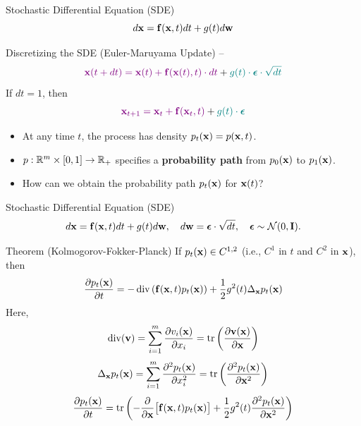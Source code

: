 \documentclass{beamer}
\begin{document}
\begin{frame}{Stochastic Differential Equation (SDE)}
	\[
		d\mathbf{x} = \mathbf{f}(\mathbf{x}, t) dt + g(t) d \mathbf{w}
	\]
	\vspace{-0.3cm}
	\begin{block}{Discretizing the SDE (Euler-Maruyama Update) – \SDESolve}
		\vspace{-0.3cm}
		\[
			{\color{violet}\mathbf{x}(t + dt) = \mathbf{x}(t) + \mathbf{f}(\mathbf{x}(t), t) \cdot dt} + {\color{teal}g(t) \cdot \boldsymbol{\epsilon} \cdot \sqrt{dt}}
		\]
		\eqpause
		If $dt=1$, then
		\vspace{-0.3cm}
		\[
			{\color{violet}\mathbf{x}_{t + 1} = \mathbf{x}_t + \mathbf{f}(\mathbf{x}_t, t)} + {\color{teal}g(t) \cdot \boldsymbol{\epsilon}}
		\]
		\vspace{-0.7cm}
	\end{block}
	\eqpause
	\begin{itemize}
		\item At any time $t$, the process has density $p_t(\mathbf{x}) = p(\mathbf{x}, t)$.
		\item $p: \mathbb{R}^m \times [0,1] \rightarrow \mathbb{R}_+$ specifies a \textbf{probability path} from $p_0(\mathbf{x})$ to $p_1(\mathbf{x})$.
		\item How can we obtain the probability path $p_t(\mathbf{x})$ for $\mathbf{x}(t)$?
	\end{itemize}
\end{frame}
\begin{frame}{Stochastic Differential Equation (SDE)}
	\vspace{-0.4cm}
	\[
		d\mathbf{x} = \mathbf{f}(\mathbf{x}, t) dt + g(t) d \mathbf{w},\quad d \mathbf{w} = \boldsymbol{\epsilon} \cdot \sqrt{dt},\quad \boldsymbol{\epsilon} \sim \mathcal{N}(0, \mathbf{I}).
	\]
	\vspace{-0.4cm}
	\begin{block}{Theorem (Kolmogorov-Fokker-Planck)}
		If $p_t(\mathbf{x}) \in C^{1,2}$ (i.e., $C^1$ in $t$ and $C^2$ in $\mathbf{x}$), then
		\vspace{-0.2cm}
		\[
			\frac{\partial p_t(\mathbf{x})}{\partial t} = - \operatorname{div}\left(\mathbf{f}(\mathbf{x}, t) p_t(\mathbf{x})\right) + \frac{1}{2}g^2(t) \Delta_{\mathbf{x}}p_t(\mathbf{x})
		\]
		\eqpause
		Here,
		\[
			\operatorname{div} (\mathbf{v}) = \sum_{i=1}^m \frac{\partial v_i(\mathbf{x})}{\partial x_i} = \operatorname{tr}\left( \frac{\partial \mathbf{v}(\mathbf{x})}{\partial \mathbf{x}}  \right)
		\]
		\[
			\Delta_{\mathbf{x}}p_t(\mathbf{x}) = \sum_{i=1}^m \frac{\partial^2 p_t(\mathbf{x})}{\partial x_i^2} = \operatorname{tr}\left( \frac{\partial^2 p_t(\mathbf{x})}{\partial \mathbf{x}^2}  \right)
		\]
		\eqpause
		\[
			\frac{\partial p_t(\mathbf{x})}{\partial t} = \operatorname{tr}\left( - \frac{\partial}{\partial \mathbf{x}} \bigl[ \mathbf{f}(\mathbf{x}, t) p_t(\mathbf{x})\bigr] + \frac{1}{2} g^2(t) \frac{\partial^2 p_t(\mathbf{x})}{\partial \mathbf{x}^2} \right)
		\]
	\end{block}
\end{frame}
\end{document}
